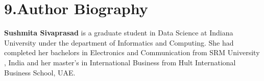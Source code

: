 \documentclass[9pt,twocolumn,twoside]{../../styles/osajnl}
\begin{document}
\section{9.Author Biography}
\textbf{Sushmita Sivaprasad} is a graduate student in Data Science at
Indiana University under the department of Informatics and
Computing. She had completed her bachelors in Electronics and
Communication from SRM University , India and her master's in
International Business from Hult International Business School, UAE.


\end{document}
